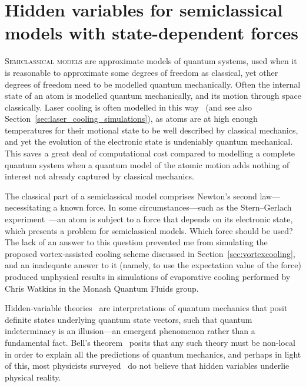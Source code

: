 
\chapter{Hidden variables for semiclassical models with state-dependent forces}\label{chap:hvsc}

\lettrine[lines=3]{S}{emiclassical models} are approximate models of quantum systems, used when it is reasonable to approximate some degrees of freedom as classical, yet other degrees of freedom need to be modelled quantum mechanically. Often the internal state of an atom is modelled quantum mechanically, and its motion through space classically. Laser cooling is often modelled in this way~\cite{mcclelland_atom-optical_1995, wallis_quantum_1995, adams_laser_1997, stenholm_semiclassical_1986, minogin_laser_1987} (and see also Section~\ref{sec:laser_cooling_simulations}), as atoms are at high enough temperatures for their motional state to be well described by classical mechanics, and yet the evolution of the electronic state is undeniably quantum mechanical. This saves a great deal of computational cost compared to modelling a complete quantum system when a quantum model of the atomic motion adds nothing of interest not already captured by classical mechanics. 

The classical part of a semiclassical model comprises Newton's second law---necessitating a known force. In some circumstances---such as the Stern--Gerlach experiment~\cite{gerlach_experimentelle_1922}---an atom is subject to a force that depends on its electronic state, which presents a problem for semiclassical models. Which force should be used? The lack of an answer to this question prevented me from simulating the proposed vortex-assisted cooling scheme discussed in Section~\ref{sec:vortexcooling}, and an inadequate answer to it (namely, to use the expectation value of the force) produced unphysical results in simulations of evaporative cooling performed by Chris Watkins in the Monash Quantum Fluids group.

Hidden-variable theories~\cite{GENOVESE2005319, PhysRevA.71.032325} are interpretations of quantum mechanics that posit definite states underlying quantum state vectors, such that quantum indeterminacy is an illusion---an emergent phenomenon rather than a fundamental fact. Bell's theorem~\cite{bell_einstein_1964} posits that any such theory must be non-local in order to explain all the predictions of quantum mechanics, and perhaps in light of this, most physicists surveyed~\cite{schlosshauer_snapshot_2013} do not believe that hidden variables underlie physical reality.

